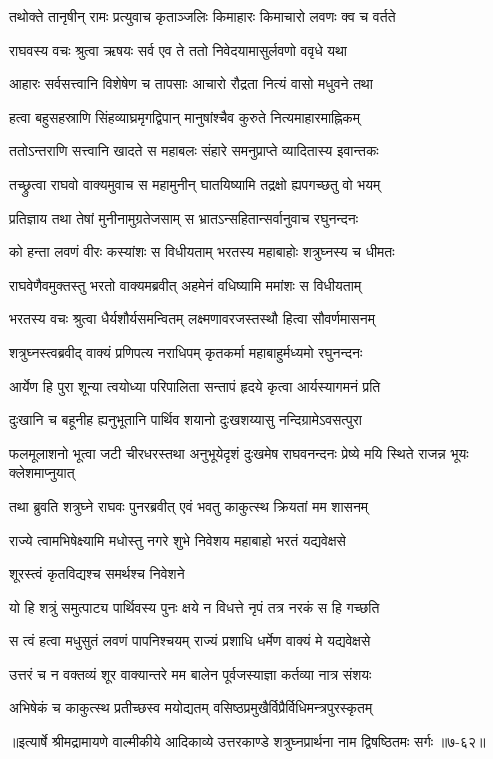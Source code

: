 
\twolineshloka
{तथोक्ते तानृषीन् रामः प्रत्युवाच कृताञ्जलिः}
{किमाहारः किमाचारो लवणः क्व च वर्तते} %

\twolineshloka
{राघवस्य वचः श्रुत्वा ऋषयः सर्व एव ते}
{ततो निवेदयामासुर्लवणो ववृधे यथा} %

\twolineshloka
{आहारः सर्वसत्त्वानि विशेषेण च तापसाः}
{आचारो रौद्रता नित्यं वासो मधुवने तथा} %

\twolineshloka
{हत्वा बहुसहस्राणि सिंहव्याघ्रमृगद्विपान्}
{मानुषांश्चैव कुरुते नित्यमाहारमाह्निकम्} %

\twolineshloka
{ततोऽन्तराणि सत्त्वानि खादते स महाबलः}
{संहारे समनुप्राप्ते व्यादितास्य इवान्तकः} %

\twolineshloka
{तच्छ्रुत्वा राघवो वाक्यमुवाच स महामुनीन्}
{घातयिष्यामि तद्रक्षो ह्यपगच्छतु वो भयम्} %

\twolineshloka
{प्रतिज्ञाय तथा तेषां मुनीनामुग्रतेजसाम्}
{स भ्रातऽन्सहितान्सर्वानुवाच रघुनन्दनः} %

\twolineshloka
{को हन्ता लवणं वीरः कस्यांशः स विधीयताम्}
{भरतस्य महाबाहोः शत्रुघ्नस्य च धीमतः} %

\twolineshloka
{राघवेणैवमुक्तस्तु भरतो वाक्यमब्रवीत्}
{अहमेनं वधिष्यामि ममांशः स विधीयताम्} %

\twolineshloka
{भरतस्य वचः श्रुत्वा धैर्यशौर्यसमन्वितम्}
{लक्ष्मणावरजस्तस्थौ हित्वा सौवर्णमासनम्} %

\twolineshloka
{शत्रुघ्नस्त्वब्रवीद् वाक्यं प्रणिपत्य नराधिपम्}
{कृतकर्मा महाबाहुर्मध्यमो रघुनन्दनः} %

\twolineshloka
{आर्येण हि पुरा शून्या त्वयोध्या परिपालिता}
{सन्तापं हृदये कृत्वा आर्यस्यागमनं प्रति} %

\twolineshloka
{दुःखानि च बहूनीह ह्यनुभूतानि पार्थिव}
{शयानो दुःखशय्यासु नन्दिग्रामेऽवसत्पुरा} %

\threelineshloka
{फलमूलाशनो भूत्वा जटी चीरधरस्तथा}
{अनुभूयेदृशं दुःखमेष राघवनन्दनः}
{प्रेष्ये मयि स्थिते राजन्न भूयः क्लेशमाप्नुयात्} %

\twolineshloka
{तथा ब्रुवति शत्रुघ्ने राघवः पुनरब्रवीत्}
{एवं भवतु काकुत्स्थ क्रियतां मम शासनम्} %

\twolineshloka
{राज्ये त्वामभिषेक्ष्यामि मधोस्तु नगरे शुभे}
{निवेशय महाबाहो भरतं यद्यवेक्षसे} %

\onelineshloka
{शूरस्त्वं कृतविद्यश्च समर्थश्च निवेशने} %

\twolineshloka
{यो हि शत्रुं समुत्पाट्य पार्थिवस्य पुनः क्षये}
{न विधत्ते नृपं तत्र नरकं स हि गच्छति} %

\twolineshloka
{स त्वं हत्वा मधुसुतं लवणं पापनिश्चयम्}
{राज्यं प्रशाधि धर्मेण वाक्यं मे यद्यवेक्षसे} %

\twolineshloka
{उत्तरं च न वक्तव्यं शूर वाक्यान्तरे मम}
{बालेन पूर्वजस्याज्ञा कर्तव्या नात्र संशयः} %

\twolineshloka
{अभिषेकं च काकुत्स्थ प्रतीच्छस्व मयोद्यतम्}
{वसिष्ठप्रमुखैर्विप्रैर्विधिमन्त्रपुरस्कृतम्} %


॥इत्यार्षे श्रीमद्रामायणे वाल्मीकीये आदिकाव्ये उत्तरकाण्डे शत्रुघ्नप्रार्थना नाम द्विषष्ठितमः सर्गः ॥७-६२॥
